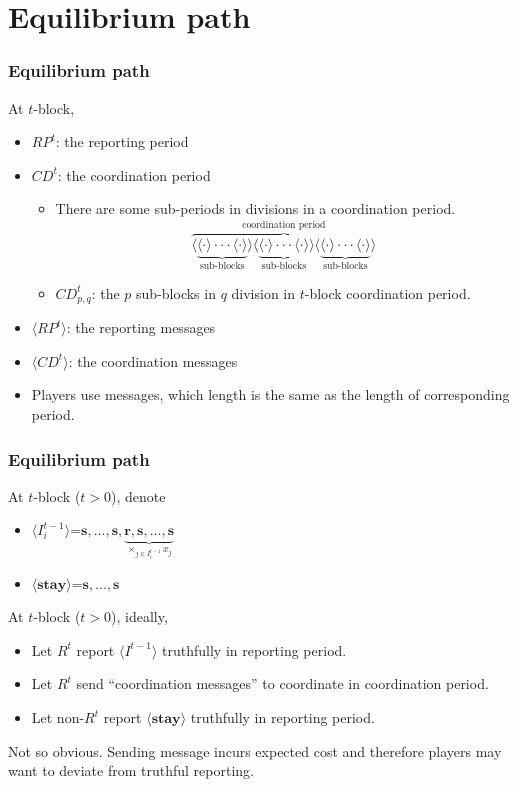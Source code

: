 \documentclass[10pt]{beamer}
\begin{document}
\section{Equilibrium path}
\begin{frame}
\frametitle{Equilibrium path}

At $t$-block, 
\begin{itemize}
\item $RP^t$: the reporting period
\item $CD^t$: the coordination period
\begin{itemize}
\item There are some sub-periods in divisions in a coordination period.
\[\overbrace{\langle\underbrace{\langle \cdot \rangle \cdot \cdot \cdot \langle \cdot \rangle}_{\text{sub-blocks}}\rangle \langle\underbrace{\langle \cdot \rangle \cdot \cdot \cdot \langle \cdot \rangle}_{\text{sub-blocks}} \rangle \langle\underbrace{\langle \cdot \rangle \cdot \cdot \cdot \langle \cdot \rangle}_{\text{sub-blocks}}\rangle}^{\text{coordination period}}\] 
\item $CD^t_{p,q}$: the $p$ sub-blocks in $q$ division in $t$-block coordination period.
\end{itemize}
\item $\langle RP^t \rangle$: the reporting messages
\item $\langle CD^t \rangle$: the coordination messages
\item Players use messages, which length is the same as the length of corresponding period.   

\end{itemize}



\end{frame}


\begin{frame}
\frametitle{Equilibrium path}

At $t$-block ($t>0$), denote
\begin{itemize}
\item $\langle I^{t-1}_i\rangle$=$\textbf{s},...,\textbf{s},\underbrace{\textbf{r},\textbf{s},...,\textbf{s}}_{\times_{j\in I^{t-1}_i}x_j}$
\item $\langle \textbf{stay} \rangle$=$\textbf{s},...,\textbf{s}$
\end{itemize}

At $t$-block ($t>0$), ideally,
\begin{itemize}
\item Let $R^t$ report $\langle I^{t-1} \rangle$ truthfully in reporting period.
\item Let $R^t$ send ``coordination messages'' to coordinate in coordination period.
\item Let non-$R^t$ report $\langle \textbf{stay} \rangle$ truthfully in reporting period.
\end{itemize}


Not so obvious. Sending message incurs expected cost and therefore players may want to deviate from truthful reporting.


\end{frame}
\end{document}
